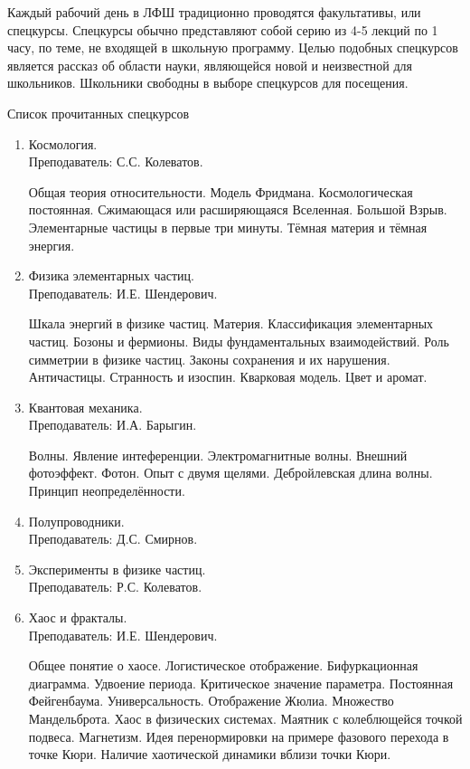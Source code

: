 \documentclass[12pt,a4paper,oneside]{scrartcl}
\begin{document}
Каждый рабочий день в ЛФШ традиционно проводятся факультативы, или
спецкурсы. Спецкурсы обычно представляют собой серию из 4-5 лекций по
1 часу, по теме, не входящей в школьную программу. Целью подобных
спецкурсов является рассказ об области науки, являющейся новой и
неизвестной для школьников. Школьники свободны в выборе спецкурсов для
посещения.

\begin{center}
\textsf{Список прочитанных спецкурсов}  
\end{center}

\begin{enumerate}
\item Космология. \\ \textsf{Преподаватель: С.С. Колеватов.}

  Общая теория относительности. Модель Фридмана. Космологическая
  постоянная. Сжимающася или расширяющаяся Вселенная. Большой
  Взрыв. Элементарные частицы в первые три минуты. Тёмная материя и
  тёмная энергия.

\item Физика элементарных частиц. \\ \textsf{Преподаватель: И.Е. Шендерович}.

  Шкала энергий в физике частиц. Материя. Классификация элементарных
  частиц. Бозоны и фермионы. Виды фундаментальных взаимодействий. Роль
  симметрии в физике частиц. Законы сохранения и их
  нарушения. Античастицы. Странность и изоспин. Кварковая модель. Цвет
  и аромат.

\item Квантовая механика. \\ \textsf{Преподаватель: И.А. Барыгин}.

  Волны. Явление интеференции. Электромагнитные волны. Внешний
  фотоэффект. Фотон. Опыт с двумя щелями. Дебройлевская длина
  волны. Принцип неопределённости.

\item Полупроводники.  \\ \textsf{Преподаватель: Д.С. Смирнов}.
\item Эксперименты в физике частиц.  \\ \textsf{Преподаватель: Р.С. Колеватов}.
\item Хаос и фракталы.\\ \textsf{Преподаватель: И.Е. Шендерович}.

  Общее понятие о хаосе. Логистическое отображение. Бифуркационная
  диаграмма. Удвоение периода. Критическое значение
  параметра. Постоянная Фейгенбаума. Универсальность. Отображение
  Жюлиа. Множество Мандельброта. Хаос в физических системах. Маятник с
  колеблющейся точкой подвеса. Магнетизм. Идея перенормировки на
  примере фазового перехода в точке Кюри. Наличие хаотической динамики
  вблизи точки Кюри.


\end{enumerate}
\end{document}
